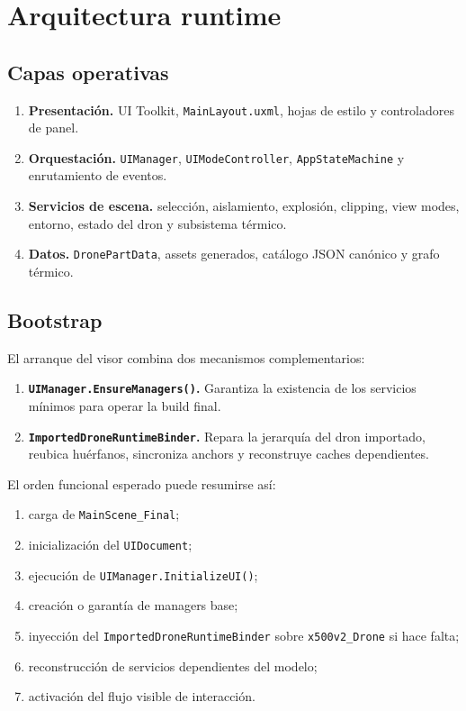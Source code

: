 \documentclass[12pt,letterpaper]{article}
\begin{document}
\section{Arquitectura runtime}

\subsection{Capas operativas}
\begin{enumerate}
    \item \textbf{Presentación.} UI Toolkit, \texttt{MainLayout.uxml}, hojas de estilo y controladores de panel.
    \item \textbf{Orquestación.} \texttt{UIManager}, \texttt{UIModeController}, \texttt{AppStateMachine} y enrutamiento de eventos.
    \item \textbf{Servicios de escena.} selección, aislamiento, explosión, clipping, view modes, entorno, estado del dron y subsistema térmico.
    \item \textbf{Datos.} \texttt{DronePartData}, assets generados, catálogo JSON canónico y grafo térmico.
\end{enumerate}

\subsection{Bootstrap}
El arranque del visor combina dos mecanismos complementarios:
\begin{enumerate}
    \item \textbf{\texttt{UIManager.EnsureManagers()}.} Garantiza la existencia de los servicios mínimos para operar la build final.
    \item \textbf{\texttt{ImportedDroneRuntimeBinder}.} Repara la jerarquía del dron importado, reubica huérfanos, sincroniza anchors y reconstruye caches dependientes.
\end{enumerate}

\noindent El orden funcional esperado puede resumirse así:
\begin{enumerate}
    \item carga de \texttt{MainScene\_Final};
    \item inicialización del \texttt{UIDocument};
    \item ejecución de \texttt{UIManager.InitializeUI()};
    \item creación o garantía de managers base;
    \item inyección del \texttt{ImportedDroneRuntimeBinder} sobre \texttt{x500v2\_Drone} si hace falta;
    \item reconstrucción de servicios dependientes del modelo;
    \item activación del flujo visible de interacción.
\end{enumerate}
\end{document}

